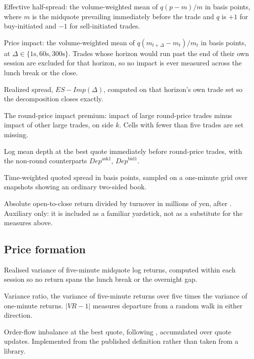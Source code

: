 \begin{description}[leftmargin=6.5em, style=nextline, nosep, font=\normalfont\itshape]
\item[$\mathit{ES}$] Effective half-spread: the volume-weighted mean of
  $q(p - m)/m$ in basis points, where $m$ is the midquote prevailing immediately
  before the trade and $q$ is $+1$ for buy-initiated and $-1$ for sell-initiated
  trades.
\item[$\mathit{Imp}(\Delta)$] Price impact: the volume-weighted mean of
  $q(m_{t+\Delta} - m_t)/m_t$ in basis points, at $\Delta \in \{1\text{s},
  60\text{s}, 300\text{s}\}$. Trades whose horizon would run past the end of
  their own session are excluded for that horizon, so no impact is ever measured
  across the lunch break or the close.
\item[$\mathit{RS}(\Delta)$] Realized spread, $\mathit{ES} - \mathit{Imp}(\Delta)$,
  computed on that horizon's own trade set so the decomposition closes exactly.
\item[$\Delta\mathit{Imp}^{kLarge}$] The round-price impact premium: impact of
  large round-price trades minus impact of other large trades, on side $k$. Cells
  with fewer than five trades are set missing.
\item[$\mathit{Dep}^{\mathrm{ask}0}, \mathit{Dep}^{\mathrm{bid}0}$] Log mean depth
  at the best quote immediately before round-price trades, with the non-round
  counterparts $\mathit{Dep}^{\mathrm{ask}1}$, $\mathit{Dep}^{\mathrm{bid}1}$.
\item[$\mathit{QS}$] Time-weighted quoted spread in basis points, sampled on a
  one-minute grid over snapshots showing an ordinary two-sided book.
\item[$\mathit{Amihud}$] Absolute open-to-close return divided by turnover in
  millions of yen, after \textcite{Amihud2002}. Auxiliary only: it is included as
  a familiar yardstick, not as a substitute for the measures above.
\end{description}

\subsection*{Price formation}

\begin{description}[leftmargin=6.5em, style=nextline, nosep, font=\normalfont\itshape]
\item[$\mathit{RV}$] Realised variance of five-minute midquote log returns,
  computed within each session so no return spans the lunch break or the
  overnight gap.
\item[$\mathit{VR}$] Variance ratio, the variance of five-minute returns over
  five times the variance of one-minute returns. $|\mathit{VR} - 1|$ measures
  departure from a random walk in either direction.
\item[$\mathit{OFI}$] Order-flow imbalance at the best quote, following
  \textcite{ContKukanovStoikov2014}, accumulated over quote updates. Implemented
  from the published definition rather than taken from a library.
\end{description}

